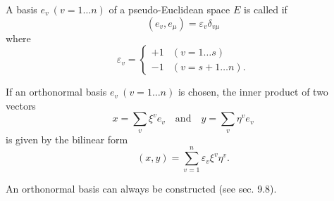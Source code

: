 A basis $e_v\ (v = 1 \ldots n)$ of a pseudo-Euclidean space $E$ is called  if
$$(e_v, e_\mu) = \varepsilon_v \delta_{v\mu}$$
where
$$\varepsilon_v = \begin{cases} +1 & (v = 1 \ldots s) \\ -1 & (v = s + 1 \ldots n). \end{cases}$$

If an orthonormal basis $e_v\ (v = 1 \ldots n)$ is chosen, the inner product of two vectors
$$x = \sum_v \xi^v e_v \quad \text{and} \quad y = \sum_v \eta^v e_v$$
is given by the bilinear form
$$(x, y) = \sum_{v=1}^n \varepsilon_v \xi^v \eta^v.$$

An orthonormal basis can always be constructed (see sec. 9.8).
